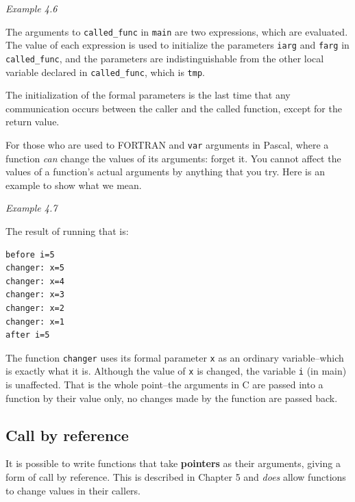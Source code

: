 \begin{center}\textit{Example 4.6}\end{center}

   The arguments to \texttt{called\_func} in \texttt{main} are two
    expressions, which are evaluated. The value of each expression is used
    to initialize the parameters \texttt{iarg} and \texttt{farg} in
    \texttt{called\_func}, and the parameters are indistinguishable from
    the other local variable declared in \texttt{called\_func}, which is
    \texttt{tmp}.


   The initialization of the formal parameters is the last time that any
    communication occurs between the caller and the called function, except
    for the return value.


   For those who are used to FORTRAN and \texttt{var} arguments in
    Pascal, where a function \textit{can} change the values of its
    arguments: forget it. You cannot affect the values of a function's
    actual arguments by anything that you try. Here is an example to show
    what we mean.

\begin{center}\textit{Example 4.7}\end{center}

   The result of running that is:

\begin{Verbatim}
before i=5
changer: x=5
changer: x=4
changer: x=3
changer: x=2
changer: x=1
after i=5
\end{Verbatim}

   The function \texttt{changer} uses its formal parameter
    \texttt{x} as an ordinary variable--which is exactly what it is.
    Although the value of \texttt{x} is changed, the variable
    \texttt{i} (in main) is unaffected. That is the whole point--the
    arguments in C are passed into a function by their value only, no
    changes made by the function are passed back.


  

  \subsection{Call by reference}
   
   It is possible to write functions that take \textbf{pointers} as
    their arguments, giving a form of call by reference. This is described
    in Chapter 5 and \textit{does} allow functions to change
    values in their callers.

